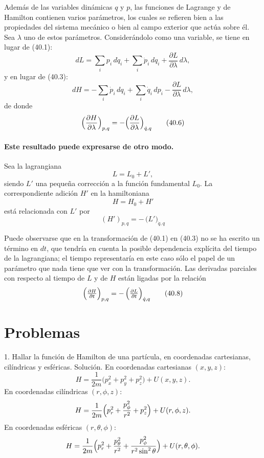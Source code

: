\documentclass[12pt]{article}
\begin{document}
Además de las variables dinámicas \(q\) y \(p\), las funciones de Lagrange y de Hamilton contienen varios parámetros, los cuales se refieren bien a las propiedades del sistema mecánico o bien al campo exterior que actúa sobre él. Sea \(\lambda\) uno de estos parámetros. Considerándolo como una variable, se tiene en lugar de (40.1):
\[
dL
= \sum_i p_i\,d\dot q_i
+ \sum_i \dot p_i\,dq_i
+ \frac{\partial L}{\partial \lambda}\,d\lambda,
\]
y en lugar de (40.3):
\[
dH
= -\sum_i \dot p_i\,dq_i
+ \sum_i \dot q_i\,dp_i
- \frac{\partial L}{\partial \lambda}\,d\lambda,
\]
de donde
\begin{equation}
\Bigl(\frac{\partial H}{\partial \lambda}\Bigr)_{p,q}
= -\Bigl(\frac{\partial L}{\partial \lambda}\Bigr)_{\dot q,q}
\tag{40.6}
\end{equation}

\paragraph*{Este resultado puede expresarse de otro modo.}
Sea la lagrangiana 
\[
L = L_0 + L',
\]
siendo \(L'\) una pequeña corrección a la función fundamental \(L_0\). La correspondiente adición \(H'\) en la hamiltoniana 
\[
H = H_0 + H'
\]
está relacionada con \(L'\) por
\begin{equation}
(H')_{p,q}
= -\,\bigl(L'\bigr)_{\dot q,q}
\tag{40.7}
\end{equation}

Puede observarse que en la transformación de (40.1) en (40.3) no se ha escrito un término en \(dt\), que tendría en cuenta la posible dependencia explícita del tiempo de la lagrangiana; el tiempo representaría en este caso sólo el papel de un parámetro que nada tiene que ver con la transformación. Las derivadas parciales con respecto al tiempo de \(L\) y de \(H\) están ligadas por la relación
\begin{equation}
\Bigl(\tfrac{\partial H}{\partial t}\Bigr)_{p,q}
= -\,\Bigl(\tfrac{\partial L}{\partial t}\Bigr)_{\dot q,q}
\tag{40.8}
\end{equation}

\section*{Problemas}

1. Hallar la función de Hamilton de una partícula, en coordenadas cartesianas, cilíndricas y esféricas.  
Solución.  
En coordenadas cartesianas \((x,y,z)\):
\[
H=\frac{1}{2m}\bigl(p_x^2+p_y^2+p_z^2\bigr)+U(x,y,z).
\]
En coordenadas cilíndricas \((r,\phi,z)\):
\[
H=\frac{1}{2m}\Bigl(p_r^2+\frac{p_\phi^2}{r^2}+p_z^2\Bigr)+U(r,\phi,z).
\]
En coordenadas esféricas \((r,\theta,\phi)\):
\[
H=\frac{1}{2m}\Bigl(p_r^2+\frac{p_\theta^2}{r^2}+\frac{p_\phi^2}{r^2\sin^2\theta}\Bigr)
+U(r,\theta,\phi).
\]
\end{document}
